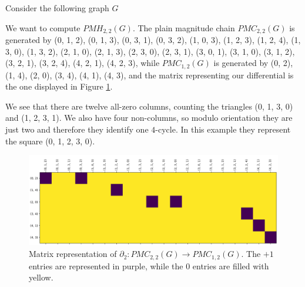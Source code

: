 \documentclass[runningheads]{llncs}
\begin{document}
\begin{example}
\label{toyexample_triangles_squares}
Consider the following graph $G$

\begin{center}
\end{center}

We want to compute $PMH_{2,2}(G)$.
The plain magnitude chain $PMC_{2,2}(G)$ is generated by (0, 1, 2), (0, 1, 3), (0, 3, 1), (0, 3, 2), (1, 0, 3), (1, 2, 3), (1, 2, 4), (1, 3, 0), (1, 3, 2), (2, 1, 0), (2, 1, 3), (2, 3, 0), (2, 3, 1), (3, 0, 1), (3, 1, 0), (3, 1, 2), (3, 2, 1), (3, 2, 4), (4, 2, 1), (4, 2, 3), while $PMC_{1,2}(G)$ is generated by (0, 2), (1, 4), (2, 0), (3, 4), (4, 1), (4, 3), and the matrix representing our differential is the one displayed in Figure \ref{matrix_toyexample_plain}.

We see that there are twelve all-zero columns, counting the triangles (0, 1, 3, 0) and (1, 2, 3, 1).
We also have four non-columns, so modulo orientation they are just two and therefore they identify one $4$-cycle.
In this example they represent the square (0, 1, 2, 3, 0).

\begin{figure}
\centering
\includegraphics[scale=0.4]{images/kernel_toy_example_plain.png}
\caption{Matrix representation of $\partial_2:PMC_{2,2}(G) \to PMC_{1,2}(G)$. The $+1$ entries are represented in purple, while the $0$ entries are filled with yellow.}
\label{matrix_toyexample_plain}
\end{figure}

\end{example}
\end{document}
